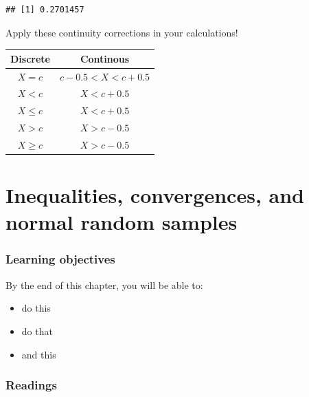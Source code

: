 \documentclass[
]{book}
\providecommand{\tightlist}{%
  \setlength{\itemsep}{0pt}\setlength{\parskip}{0pt}}
\theoremstyle{definition}
\theoremstyle{definition}
\theoremstyle{definition}
\theoremstyle{definition}
\theoremstyle{remark}
\begin{document}
\begin{verbatim}
## [1] 0.2701457
\end{verbatim}

Apply these continuity corrections in your calculations!

\begin{longtable}[]{@{}cc@{}}
\toprule
Discrete & Continous \\
\midrule
\endhead
\(X=c\) & \(c-0.5 < X < c + 0.5\) \\
\(X<c\) & \(X < c + 0.5\) \\
\(X\leq c\) & \(X < c + 0.5\) \\
\(X>c\) & \(X>c-0.5\) \\
\(X\geq c\) & \(X>c-0.5\) \\
\bottomrule
\end{longtable}

\hypertarget{inequalities-convergences-and-normal-random-samples}{%
\chapter{Inequalities, convergences, and normal random samples}\label{inequalities-convergences-and-normal-random-samples}}

\hypertarget{learning-objectives-2}{%
\subsection*{Learning objectives}\label{learning-objectives-2}}

By the end of this chapter, you will be able to:

\begin{itemize}
\tightlist
\item
  do this
\item
  do that
\item
  and this
\end{itemize}

\hypertarget{readings-2}{%
\subsection*{Readings}\label{readings-2}}
\end{document}
